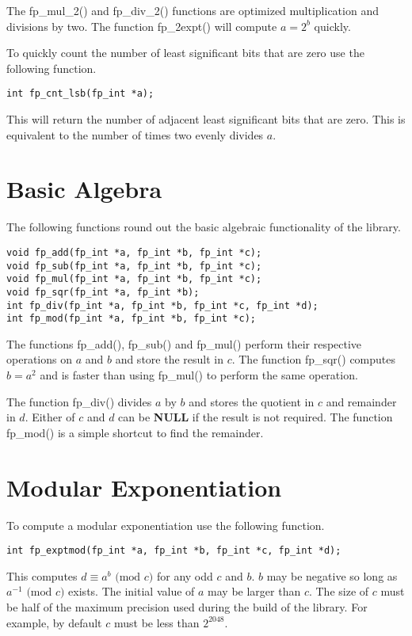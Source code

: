 \documentclass[b5paper]{book}
\begin{document}
The fp\_mul\_2() and fp\_div\_2() functions are optimized multiplication and divisions by two.  The 
function fp\_2expt() will compute $a = 2^b$ quickly.

To quickly count the number of least significant bits that are zero use the following function.

\begin{verbatim}
int fp_cnt_lsb(fp_int *a);
\end{verbatim}
This will return the number of adjacent least significant bits that are zero.  This is equivalent 
to the number of times two evenly divides $a$.

\section{Basic Algebra}

The following functions round out the basic algebraic functionality of the library.

     
\begin{verbatim}
void fp_add(fp_int *a, fp_int *b, fp_int *c);
void fp_sub(fp_int *a, fp_int *b, fp_int *c);
void fp_mul(fp_int *a, fp_int *b, fp_int *c);
void fp_sqr(fp_int *a, fp_int *b);
int fp_div(fp_int *a, fp_int *b, fp_int *c, fp_int *d);
int fp_mod(fp_int *a, fp_int *b, fp_int *c);
\end{verbatim}

The functions fp\_add(), fp\_sub() and fp\_mul() perform their respective operations on $a$ and
$b$ and store the result in $c$.  The function fp\_sqr() computes $b = a^2$ and is faster than
using fp\_mul() to perform the same operation.

The function fp\_div() divides $a$ by $b$ and stores the quotient in $c$ and remainder in $d$.  Either 
of $c$ and $d$ can be \textbf{NULL} if the result is not required.  The function fp\_mod() is a simple 
shortcut to find the remainder.

\section{Modular Exponentiation}
To compute a modular exponentiation use the following function.

\begin{verbatim}
int fp_exptmod(fp_int *a, fp_int *b, fp_int *c, fp_int *d);
\end{verbatim}
This computes $d \equiv a^b \mbox{ (mod }c\mbox{)}$ for any odd $c$ and $b$.  $b$ may be negative so long as 
$a^{-1} \mbox{ (mod }c\mbox{)}$ exists.  The initial value of $a$ may be larger than $c$.  The size of $c$ must be 
half of the maximum precision used during the build of the library.  For example, by default $c$ must be less 
than $2^{2048}$.  
\end{document}
